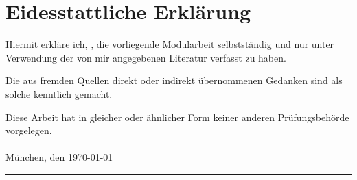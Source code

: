\chapter{Eidesstattliche Erkl\"arung}
Hiermit erkl\"are ich, \Author, die vorliegende Modularbeit selbstst\"andig und nur unter Verwendung der von mir angegebenen Literatur verfasst zu haben. 

Die aus fremden Quellen direkt oder indirekt \"ubernommenen Gedanken sind als solche kenntlich gemacht.

Diese Arbeit hat in gleicher oder \"ahnlicher Form keiner anderen Pr\"ufungsbeh\"orde vorgelegen.\\
\\[6ex]

M\"unchen, den \today


\rule[-0.2cm]{5cm}{0.5pt}

\textsc{\Author} 

